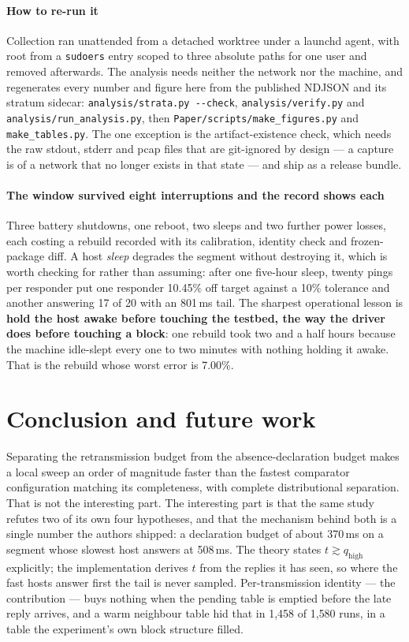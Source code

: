 \documentclass[conference]{IEEEtran}
\newcommand{\qhigh}{q_{\mathrm{high}}}
\begin{document}
\paragraph*{How to re-run it} Collection ran unattended from a detached
worktree under a launchd agent, with root from a \texttt{sudoers} entry scoped
to three absolute paths for one user and removed afterwards. The analysis needs
neither the network nor the machine, and regenerates every number and figure
here from the published NDJSON and its stratum sidecar:
\texttt{analysis/strata.py -{}-check}, \texttt{analysis/verify.py} and
\texttt{analysis/run\_analysis.py}, then \texttt{Paper/scripts/make\_figures.py}
and \texttt{make\_tables.py}. The one exception is the artifact-existence
check, which needs the raw stdout, stderr and pcap files that are git-ignored
by design --- a capture is of a network that no longer exists in that state ---
and ship as a release bundle.

\paragraph*{The window survived eight interruptions and the record shows each}
Three battery shutdowns, one reboot, two sleeps and two further power losses,
each costing a rebuild recorded with its calibration, identity check and
frozen-package diff. A host \emph{sleep} degrades the segment without
destroying it, which is worth checking for rather than assuming: after one
five-hour sleep, twenty pings per responder put one responder 10.45\% off
target against a 10\% tolerance and another answering 17 of 20 with an 801\,ms
tail. The sharpest operational lesson is \textbf{hold the host awake before
touching the testbed, the way the driver does before touching a block}: one
rebuild took two and a half hours because the machine idle-slept every one to
two minutes with nothing holding it awake. That is the rebuild whose worst
error is 7.00\%.

\section{Conclusion and future work}
\label{sec:future}

Separating the retransmission budget from the absence-declaration budget makes
a local sweep an order of magnitude faster than the fastest comparator
configuration matching its completeness, with complete distributional
separation. That is not the interesting part. The interesting part is that the
same study refutes two of its own four hypotheses, and that the mechanism
behind both is a single number the authors shipped: a declaration budget of
about 370\,ms on a segment whose slowest host answers at 508\,ms. The theory
states $t\gtrsim\qhigh$ explicitly; the implementation derives $t$ from the
replies it has seen, so where the fast hosts answer first the tail is never
sampled. Per-transmission identity --- the contribution --- buys nothing when
the pending table is emptied before the late reply arrives, and a warm
neighbour table hid that in 1{,}458 of 1{,}580 runs, in a table the
experiment's own block structure filled.
\end{document}
